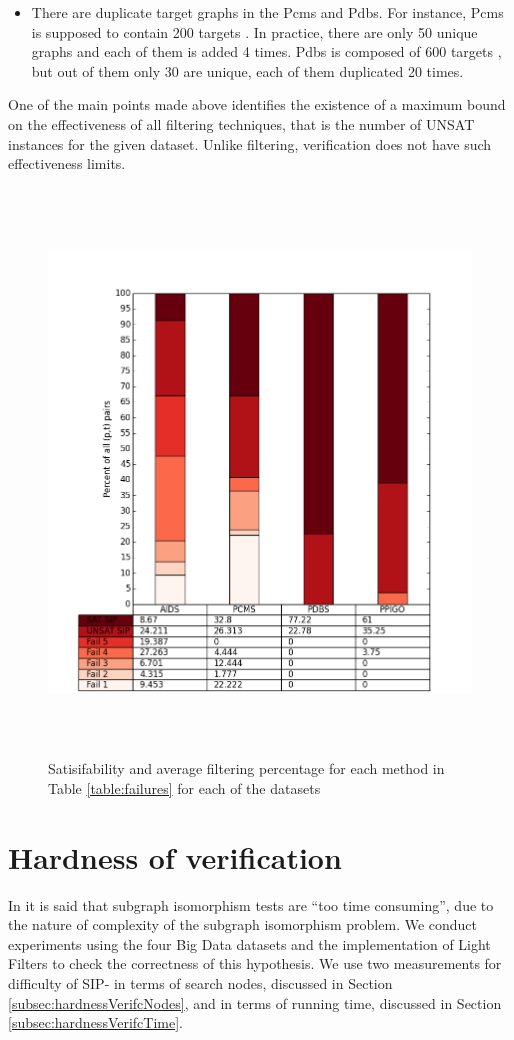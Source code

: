 \documentclass{l4proj}
\begin{document}
\begin{itemize}
\item There are duplicate target graphs in the Pcms and Pdbs. For instance, Pcms is supposed to contain 200 targets \cite{datasets}. In practice, there are only 50 unique graphs and each of them is added 4 times. Pdbs is composed of 600 targets \cite{datasets}, but out of them only 30 are unique, each of them duplicated 20 times.

\end{itemize}

One of the main points made above identifies the existence of a maximum bound on the effectiveness of all filtering techniques, that is the number of UNSAT instances for the given dataset. Unlike filtering, verification does not have such effectiveness limits.
 
\begin{figure}
\centering
\includegraphics[height=15cm,width=13.5cm]{images/plots/splittedSIP.png}
\caption{Satisifability and average filtering percentage for each method in Table \ref{table:failures} for each of the datasets}
\label{averageFailures}
\end{figure}

\section{Hardness of verification}
In \cite{foteini} it is said that subgraph isomorphism tests are ``too time consuming'', due to the nature of complexity of the subgraph isomorphism problem. We conduct experiments using the four Big Data datasets and the implementation of Light Filters to check the correctness of this hypothesis. We use two measurements for difficulty of SIP- in terms of search nodes, discussed in Section \ref{subsec:hardnessVerifcNodes}, and in terms of running time, discussed in Section \ref{subsec:hardnessVerifcTime}. 
\end{document}
